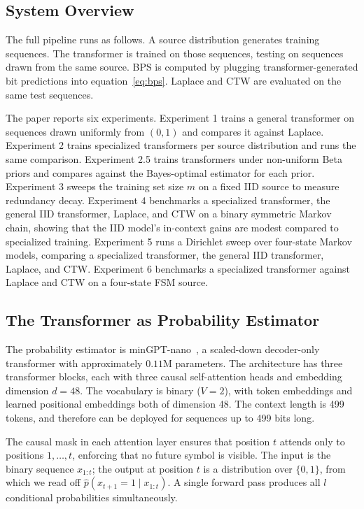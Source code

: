 \documentclass[onecolumn,english,12pt]{IEEEtran}
\theoremstyle{plain}
\theoremstyle{plain}
\theoremstyle{plain}
\theoremstyle{definition}
\begin{document}
\subsection{System Overview}

The full pipeline runs as follows. A source distribution generates
training sequences. The transformer is trained on those sequences, testing on sequences drawn from the same source. BPS is
computed by plugging transformer-generated bit predictions into
equation~\eqref{eq:bps}. Laplace and CTW are evaluated on the same
test sequences.

The paper reports six experiments. Experiment 1 trains a general
transformer on sequences drawn uniformly from $(0,1)$ and compares it
against Laplace. Experiment 2 trains specialized transformers per source
distribution and runs the same comparison. Experiment 2.5 trains
transformers under non-uniform Beta priors and compares against the
Bayes-optimal estimator for each prior. Experiment 3 sweeps the
training set size $m$ on a fixed IID source to measure redundancy
decay. Experiment 4 benchmarks a specialized transformer, the general IID
transformer, Laplace, and CTW on a binary symmetric Markov chain, showing
that the IID model's in-context gains are modest compared to specialized
training. Experiment 5 runs a Dirichlet sweep
over four-state Markov models, comparing a specialized transformer, the
general IID transformer, Laplace, and CTW. Experiment 6 benchmarks a
specialized transformer against Laplace and CTW on a four-state FSM source.

\subsection{The Transformer as Probability Estimator}
\label{sec:transformer}

The probability estimator is minGPT-nano~\cite{minGPT}, a scaled-down
decoder-only transformer with approximately $0.11$M parameters.
The architecture has three transformer blocks, each with three causal
self-attention heads and embedding dimension $d = 48$.
The vocabulary is binary ($V = 2$), with token embeddings and
learned positional embeddings both of dimension 48. The context length is
499 tokens, and therefore can be deployed for sequences up to 499 bits long.

The causal mask in each attention layer ensures that position $t$ attends
only to positions $1, \ldots, t$, enforcing that no future symbol is
visible. The input is the binary sequence $x_{1:t}$; the output at
position $t$ is a distribution over $\{0, 1\}$, from which we read off
$\hat{p}(x_{t+1} = 1 \mid x_{1:t})$. A single forward pass produces all
$l$ conditional probabilities simultaneously.
\end{document}
